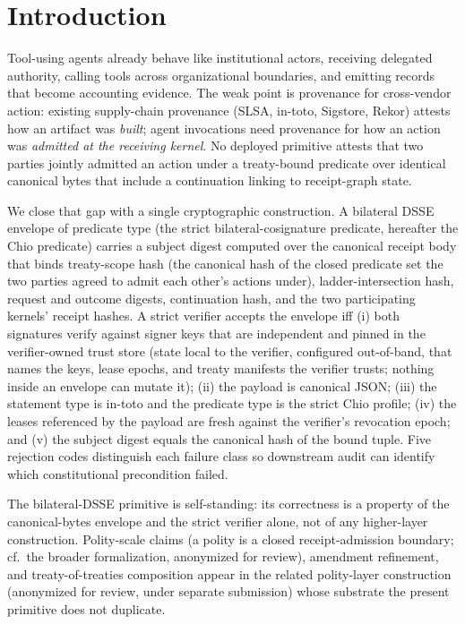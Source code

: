 \section{Introduction}

Tool-using agents already behave like institutional actors, receiving delegated authority, calling tools across organizational boundaries, and emitting records that become accounting evidence. The weak point is provenance for cross-vendor action: existing supply-chain provenance (SLSA, in-toto, Sigstore, Rekor) attests how an artifact was \emph{built}; agent invocations need provenance for how an action was \emph{admitted at the receiving kernel}. No deployed primitive attests that two parties jointly admitted an action under a treaty-bound predicate over identical canonical bytes that include a continuation linking to receipt-graph state.

We close that gap with a single cryptographic construction. A bilateral DSSE envelope of predicate type  (the strict bilateral-cosignature predicate, hereafter the Chio predicate) carries a subject digest computed over the canonical receipt body that binds treaty-scope hash (the canonical hash of the closed predicate set the two parties agreed to admit each other's actions under), ladder-intersection hash, request and outcome digests, continuation hash, and the two participating kernels' receipt hashes. A strict verifier accepts the envelope iff (i) both signatures verify against signer keys that are independent and pinned in the verifier-owned trust store (state local to the verifier, configured out-of-band, that names the keys, lease epochs, and treaty manifests the verifier trusts; nothing inside an envelope can mutate it); (ii) the payload is canonical JSON; (iii) the statement type is in-toto and the predicate type is the strict Chio profile; (iv) the leases referenced by the payload are fresh against the verifier's revocation epoch; and (v) the subject digest equals the canonical hash of the bound tuple. Five rejection codes distinguish each failure class so downstream audit can identify which constitutional precondition failed.

The bilateral-DSSE primitive is self-standing: its correctness is a property of the canonical-bytes envelope and the strict verifier alone, not of any higher-layer construction. Polity-scale claims (a polity is a closed receipt-admission boundary; cf.\ the broader formalization, anonymized for review), amendment refinement, and treaty-of-treaties composition appear in the related polity-layer construction (anonymized for review, under separate submission) whose substrate the present primitive does not duplicate.

